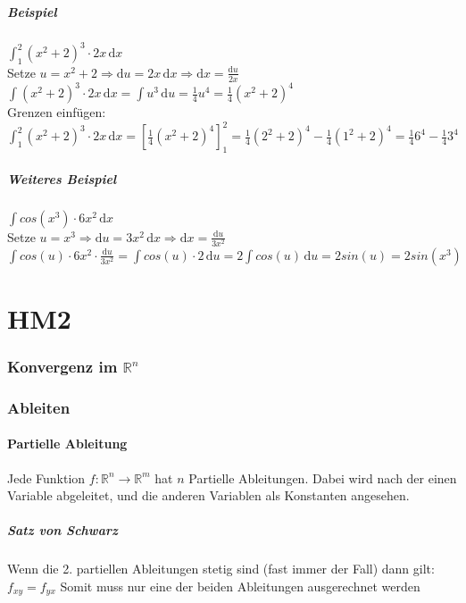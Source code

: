 \documentclass[a4paper,portrait]{scrartcl}
\begin{document}
\subsubsection*{Beispiel}
$ \int_{1}^{2} \!(x^2+2)^3 \cdot 2x \,\mathrm{d}x $ \\
Setze $ u = x^2 + 2 \Rightarrow \mathrm{d}u = 2x \,\mathrm{d}x \Rightarrow \mathrm{d}x = \frac{\mathrm{d}u}{2x}$ \\
$ \int \!(x^2+2)^3 \cdot 2x \,\mathrm{d}x = \int \! u^3 \,\mathrm{d}u = \frac{1}{4}u^4 = \frac{1}{4}(x^2+2)^4$ \\
Grenzen einfügen: $ \int_{1}^{2} \!(x^2+2)^3 \cdot 2x \,\mathrm{d}x = \left[ \frac{1}{4}(x^2+2)^4 \right]_1^2 = \frac{1}{4}(2^2+2)^4 - \frac{1}{4}(1^2+2)^4 = \frac{1}{4}6^4 - \frac{1}{4}3^4$
\subsubsection*{Weiteres Beispiel}
$ \int \!cos(x^3) \cdot 6x^2 \,\mathrm{d}x $ \\
Setze $ u = x^3 \Rightarrow \mathrm{d}u = 3x^2 \,\mathrm{d}x \Rightarrow \mathrm{d}x = \frac{\mathrm{d}u}{3x^2}$ \\
$ \int \!cos(u) \cdot 6x^2 \cdot \frac{\mathrm{d}u}{3x^2} = \int \!cos(u) \cdot 2 \,\mathrm{d}u = 2 \int \!cos(u) \,\mathrm{d}u = 2 sin(u) = 2 sin(x^3)$



\clearpage
\part*{HM2}
\section{Konvergenz im $\mathbb{R}^n$}
\section{Ableiten}
\subsection{Partielle Ableitung}
Jede Funktion $f: \mathbb{R}^n \rightarrow \mathbb{R}^m$ hat $n$ Partielle Ableitungen.
Dabei wird nach der einen Variable abgeleitet, und die anderen Variablen als Konstanten angesehen.
\subsubsection{Satz von Schwarz}
Wenn die 2. partiellen Ableitungen stetig sind (fast immer der Fall) dann gilt: \\
$ f_{xy} = f_{yx} $ Somit muss nur eine der beiden Ableitungen ausgerechnet werden
\end{document}
